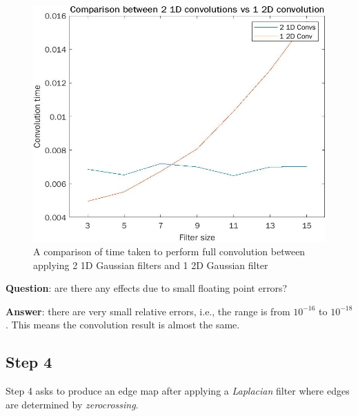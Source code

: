\documentclass[lettersize,journal]{IEEEtran}
\begin{document}
\begin{figure}[h]
    \centering
    \includegraphics[width=\linewidth]{2d_vs_1d}
    \caption{A comparison of time taken to perform full convolution between applying 2 1D Gaussian filters and 1 2D Gaussian filter}
    \label{fig:6}
\end{figure}

\noindent\textbf{Question}: are there any effects due to small floating point errors?

\hfill

\noindent\textbf{Answer}: there are very small relative errors, i.e., the range is from $10^{-16}$ to $10^{-18}$. This means the convolution result is almost the same.

\subsection{Step 4}\label{subsection:3:2}

\noindent Step 4 asks to produce an edge map after applying a \emph{Laplacian} filter where edges are determined by \emph{zerocrossing}.
\end{document}
